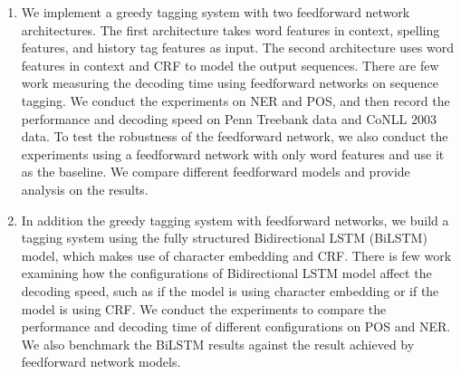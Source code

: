\documentclass{sfuthesis}
\begin{document}
\begin{enumerate}

\item We implement a greedy tagging system with two feedforward network architectures. The first architecture takes word features in context, spelling features, and history tag features as input. The second architecture uses word features in context and CRF to model the output sequences. There are few work measuring the decoding time using feedforward networks on sequence tagging. We conduct the experiments on NER and POS, and then record the performance and decoding speed on Penn Treebank data and CoNLL 2003 data. To test the robustness of the feedforward network, we also conduct the experiments using a feedforward network with only word features and use it as the baseline. We compare different feedforward models and provide analysis on the results. 

\item In addition the greedy tagging system with feedforward networks, we build a tagging system using the fully structured Bidirectional LSTM (BiLSTM) model, which makes use of character embedding and CRF. There is few work examining how the configurations of Bidirectional LSTM model affect the decoding speed, such as if the model is using character embedding or if the model is using CRF. We conduct the experiments to compare the performance and decoding time of different configurations on POS and NER. We also benchmark the BiLSTM results against the result achieved by feedforward network models.


\end{enumerate}
\end{document}

